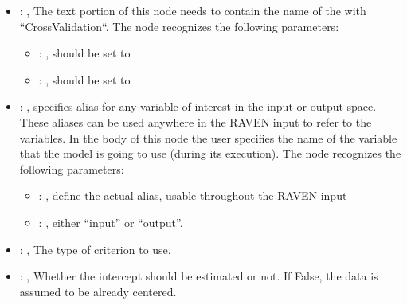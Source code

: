 \begin{itemize}
\begin{itemize}
        \item {}: ,
          List of IDs of features/variables to include in the transformation process.

        \item {}: ,
          Which space to search? Target or Feature?
      \end{itemize}

    \item {}: ,
      The text portion of this node needs to contain the name of the  with
               ``CrossValidation``.
      The  node recognizes the following parameters:
        \begin{itemize}
          \item {}: ,
            should be set to 
          \item {}: ,
            should be set to 
      \end{itemize}

    \item {}: ,
      specifies alias for         any variable of interest in the input or output space. These
      aliases can be used anywhere in the RAVEN input to         refer to the variables. In the body
      of this node the user specifies the name of the variable that the model is going to use
      (during its execution).
      The  node recognizes the following parameters:
        \begin{itemize}
          \item {}: ,
            define the actual alias, usable throughout the RAVEN input
          \item {}: ,
            either ``input'' or ``output''.
      \end{itemize}

    \item {}: ,
      The type of criterion to use.

    \item {}: ,
      Whether the intercept should be estimated or not. If False,
      the data is assumed to be already centered.


\end{itemize}
